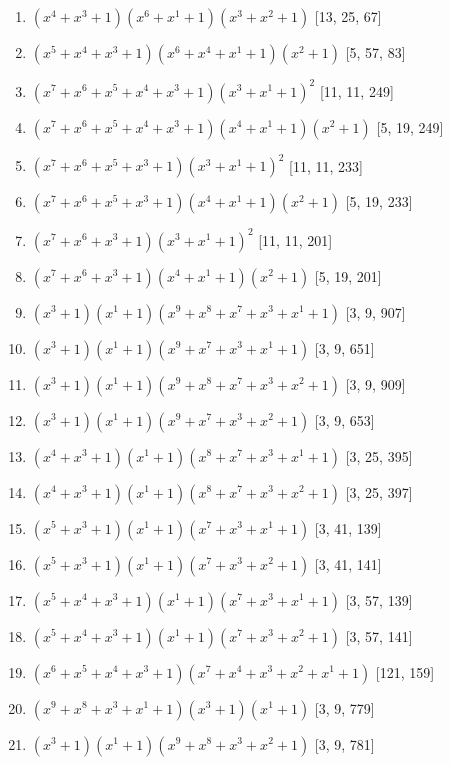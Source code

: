 \documentclass[10pt,twocolumn]{article}
\begin{document}
\begin{enumerate}
\item $(x^{4} + x^{3} + 1)(x^{6} + x^{1} + 1)(x^{3} + x^{2} + 1)$  [13, 25, 67]
\item $(x^{5} + x^{4} + x^{3} + 1)(x^{6} + x^{4} + x^{1} + 1)(x^{2} + 1)$  [5, 57, 83]
\item $(x^{7} + x^{6} + x^{5} + x^{4} + x^{3} + 1)(x^{3} + x^{1} + 1)^{2}$  [11, 11, 249]
\item $(x^{7} + x^{6} + x^{5} + x^{4} + x^{3} + 1)(x^{4} + x^{1} + 1)(x^{2} + 1)$  [5, 19, 249]
\item $(x^{7} + x^{6} + x^{5} + x^{3} + 1)(x^{3} + x^{1} + 1)^{2}$  [11, 11, 233]
\item $(x^{7} + x^{6} + x^{5} + x^{3} + 1)(x^{4} + x^{1} + 1)(x^{2} + 1)$  [5, 19, 233]
\item $(x^{7} + x^{6} + x^{3} + 1)(x^{3} + x^{1} + 1)^{2}$  [11, 11, 201]
\item $(x^{7} + x^{6} + x^{3} + 1)(x^{4} + x^{1} + 1)(x^{2} + 1)$  [5, 19, 201]
\item $(x^{3} + 1)(x^{1} + 1)(x^{9} + x^{8} + x^{7} + x^{3} + x^{1} + 1)$  [3, 9, 907]
\item $(x^{3} + 1)(x^{1} + 1)(x^{9} + x^{7} + x^{3} + x^{1} + 1)$  [3, 9, 651]
\item $(x^{3} + 1)(x^{1} + 1)(x^{9} + x^{8} + x^{7} + x^{3} + x^{2} + 1)$  [3, 9, 909]
\item $(x^{3} + 1)(x^{1} + 1)(x^{9} + x^{7} + x^{3} + x^{2} + 1)$  [3, 9, 653]
\item $(x^{4} + x^{3} + 1)(x^{1} + 1)(x^{8} + x^{7} + x^{3} + x^{1} + 1)$  [3, 25, 395]
\item $(x^{4} + x^{3} + 1)(x^{1} + 1)(x^{8} + x^{7} + x^{3} + x^{2} + 1)$  [3, 25, 397]
\item $(x^{5} + x^{3} + 1)(x^{1} + 1)(x^{7} + x^{3} + x^{1} + 1)$  [3, 41, 139]
\item $(x^{5} + x^{3} + 1)(x^{1} + 1)(x^{7} + x^{3} + x^{2} + 1)$  [3, 41, 141]
\item $(x^{5} + x^{4} + x^{3} + 1)(x^{1} + 1)(x^{7} + x^{3} + x^{1} + 1)$  [3, 57, 139]
\item $(x^{5} + x^{4} + x^{3} + 1)(x^{1} + 1)(x^{7} + x^{3} + x^{2} + 1)$  [3, 57, 141]
\item $(x^{6} + x^{5} + x^{4} + x^{3} + 1)(x^{7} + x^{4} + x^{3} + x^{2} + x^{1} + 1)$  [121, 159]
\item $(x^{9} + x^{8} + x^{3} + x^{1} + 1)(x^{3} + 1)(x^{1} + 1)$  [3, 9, 779]
\item $(x^{3} + 1)(x^{1} + 1)(x^{9} + x^{8} + x^{3} + x^{2} + 1)$  [3, 9, 781]

\end{enumerate}
\end{document}
